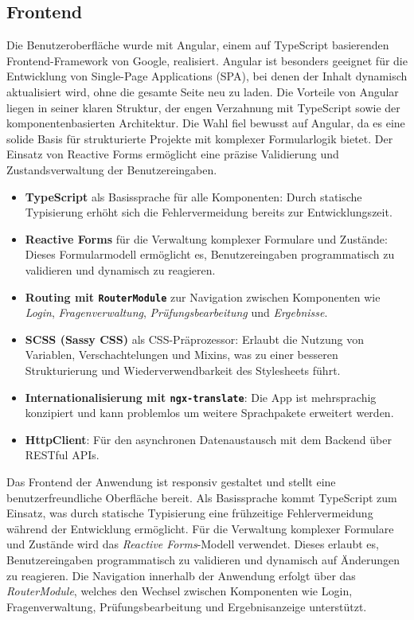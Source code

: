\documentclass[a4paper,12pt]{article}
\begin{document}
\subsection{Frontend}
Die Benutzeroberfläche wurde mit Angular, einem auf TypeScript basierenden Frontend-Framework von Google, realisiert. Angular ist besonders geeignet für die Entwicklung von Single-Page Applications (SPA), bei denen der Inhalt dynamisch aktualisiert wird, ohne die gesamte Seite neu zu laden. Die Vorteile von Angular liegen in seiner klaren Struktur, der engen Verzahnung mit TypeScript sowie der komponentenbasierten Architektur. Die Wahl fiel bewusst auf Angular, da es eine solide Basis für strukturierte Projekte mit komplexer Formularlogik bietet. Der Einsatz von Reactive Forms ermöglicht eine präzise Validierung und Zustandsverwaltung der Benutzereingaben.


\begin{itemize}
    \item \textbf{TypeScript} als Basissprache für alle Komponenten: Durch statische Typisierung erhöht sich die Fehlervermeidung bereits zur Entwicklungszeit.
    
    \item \textbf{Reactive Forms} für die Verwaltung komplexer Formulare und Zustände: Dieses Formularmodell ermöglicht es, Benutzereingaben programmatisch zu validieren und dynamisch zu reagieren.
    
    \item \textbf{Routing mit \texttt{RouterModule}} zur Navigation zwischen Komponenten wie \textit{Login}, \textit{Fragenverwaltung}, \textit{Prüfungsbearbeitung} und \textit{Ergebnisse}.
    
    \item \textbf{SCSS (Sassy CSS)} als CSS-Präprozessor: Erlaubt die Nutzung von Variablen, Verschachtelungen und Mixins, was zu einer besseren Strukturierung und Wiederverwendbarkeit des Stylesheets führt.
    
    \item \textbf{Internationalisierung mit \texttt{ngx-translate}}: Die App ist mehrsprachig konzipiert und kann problemlos um weitere Sprachpakete erweitert werden.
    
    \item \textbf{HttpClient}: Für den asynchronen Datenaustausch mit dem Backend über RESTful APIs.
\end{itemize}

Das Frontend der Anwendung ist responsiv gestaltet und stellt eine benutzerfreundliche Oberfläche bereit. Als Basissprache kommt TypeScript zum Einsatz, was durch statische Typisierung eine frühzeitige Fehlervermeidung während der Entwicklung ermöglicht. Für die Verwaltung komplexer Formulare und Zustände wird das \textit{Reactive Forms}-Modell verwendet. Dieses erlaubt es, Benutzereingaben programmatisch zu validieren und dynamisch auf Änderungen zu reagieren. Die Navigation innerhalb der Anwendung erfolgt über das \textit{RouterModule}, welches den Wechsel zwischen Komponenten wie Login, Fragenverwaltung, Prüfungsbearbeitung und Ergebnisanzeige unterstützt.
\end{document}
